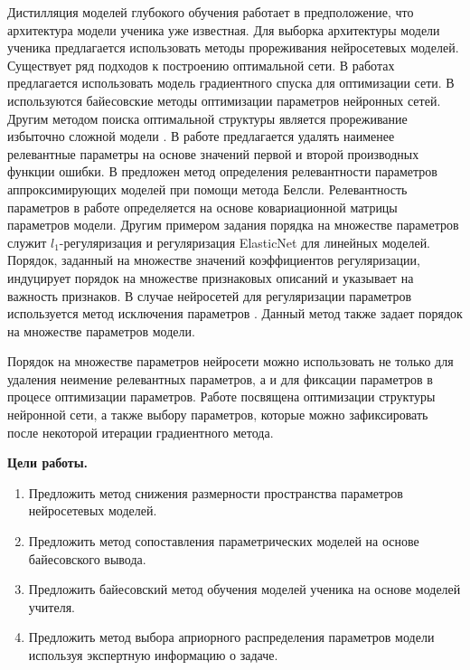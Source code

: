Дистилляция моделей глубокого обучения работает в предположение, что архитектура модели ученика уже известная. Для выборка архитектуры модели ученика предлагается использовать методы прореживания нейросетевых моделей. Существует ряд подходов к построению оптимальной сети. В работах \cite{maclarin2015, luketina2015} предлагается использовать модель градиентного спуска для оптимизации сети. В \cite{molchanov2017} используются байесовские методы \cite{neal1995} оптимизации параметров нейронных сетей. Другим методом поиска оптимальной структуры является прореживание избыточно сложной модели \cite{cun1990, louizos2017, graves2011}. В работе \cite{cun1990} предлагается удалять наименее релевантные параметры на основе значений первой и второй производных функции ошибки. В \cite{grabovoy2019} предложен метод определения релевантности параметров аппроксимирующих моделей при помощи метода Белсли. Релевантность параметров в работе \cite{grabovoy2019} определяется на основе ковариационной матрицы параметров модели.
Другим примером задания порядка на множестве параметров служит $l_1$-регуляризация \cite{Tibshirani1996} и регуляризация ElasticNet \cite{Hastie2005} для линейных моделей.
Порядок, заданный на множестве значений коэффициентов регуляризации, индуцирует порядок на множестве признаковых описаний и указывает на важность признаков.
В случае нейросетей для регуляризации параметров используется метод исключения параметров \cite{srivastava2014, molchanov2017}.
Данный метод также задает порядок на множестве параметров модели.

Порядок на множестве параметров нейросети можно использовать не только для удаления неимение релевантных параметров, а и для фиксации параметров в процесе оптимизации параметров. Работе \cite{grabovoy2020} посвящена оптимизации структуры нейронной сети, а также выбору параметров, которые можно зафиксировать после некоторой итерации градиентного метода.

\vspace{0.5cm}
\textbf{Цели работы.}
\vspace{0.2cm}
\begin{enumerate}
\item Предложить метод снижения размерности пространства параметров нейросетевых моделей.
\item Предложить метод сопоставления параметрических моделей на основе байесовского вывода.
\item Предложить байесовский метод обучения моделей ученика на основе моделей учителя.
\item Предложить метод выбора априорного распределения параметров модели используя экспертную информацию о задаче.
\end{enumerate}

